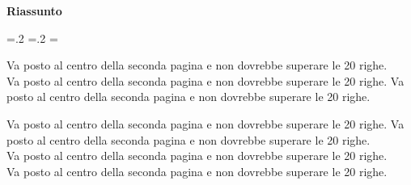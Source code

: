 	
	\vspace*{\fill}
	\begin{center}
		\textbf{\LARGE Riassunto}\newline\newline
	\end{center}
	\begin{list}{}{%
			\leftmargin=.2\textwidth
			\rightmargin=.2\textwidth
			\listparindent=\parindent
			\itemsep=0pt
			\parsep=0pt}
		\item\relax
			Va posto al centro della seconda pagina e non dovrebbe superare le 20 righe.\\
			Va posto al centro della seconda pagina e non dovrebbe superare le 20 righe.
			Va posto al centro della seconda pagina e non dovrebbe superare le 20 righe.\\
			\par Va posto al centro della seconda pagina e non dovrebbe superare le 20 righe.
			Va posto al centro della seconda pagina e non dovrebbe superare le 20 righe.\\
			Va posto al centro della seconda pagina e non dovrebbe superare le 20 righe.\\
			Va posto al centro della seconda pagina e non dovrebbe superare le 20 righe.
		
	\end{list}
	\vfill %
	\clearpage



\clearpage